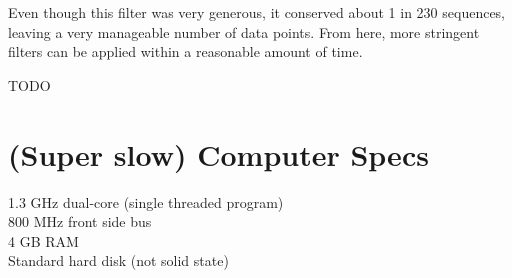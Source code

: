 \documentclass[a4paper, 12pt]{report}
\begin{document}
    Even though this filter was very generous, it conserved about 1 in 230 sequences, 
        leaving a very manageable number of data points.  
    From here, more stringent filters can be applied within a reasonable amount of time. 
    
    TODO

\section{(Super slow) Computer Specs}
    1.3 GHz dual-core (single threaded program) \\
    800 MHz front side bus \\
    4 GB RAM \\
    Standard hard disk (not solid state)
\end{document}
